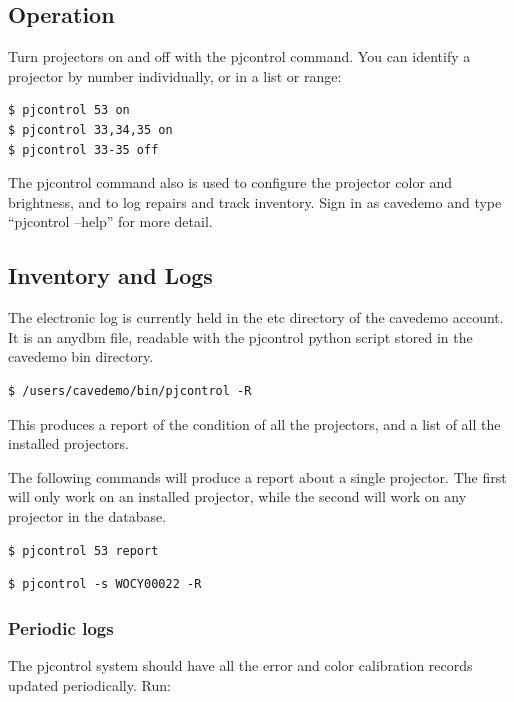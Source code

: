 \documentclass[11pt]{article}
\begin{document}
\subsection{Operation}
\label{projector-operation}

Turn projectors on and off with the pjcontrol command.  You can
identify a projector by number individually, or in a list or range: 

\begin{verbatim}
$ pjcontrol 53 on
$ pjcontrol 33,34,35 on
$ pjcontrol 33-35 off
\end{verbatim}

The pjcontrol command also is used to configure the projector color
and brightness, and to log repairs and track inventory.  Sign in as
cavedemo and type ``pjcontrol --help'' for more detail.


\subsection{Inventory and Logs}
\label{logging}

The electronic log is currently held in the etc directory of the
cavedemo account.  It is an anydbm file, readable with the pjcontrol
python script stored in the cavedemo bin directory.

\begin{verbatim}
$ /users/cavedemo/bin/pjcontrol -R
\end{verbatim}

This produces a report of the condition of all the projectors, and a
list of all the installed projectors.

The following commands will produce a report about a single
projector.  The first will only work on an installed projector, while
the second will work on any projector in the database.

\begin{verbatim}
$ pjcontrol 53 report
\end{verbatim}

\begin{verbatim}
$ pjcontrol -s WOCY00022 -R
\end{verbatim}

\subsubsection{Periodic logs}

The pjcontrol system should have all the error and color calibration
records updated periodically.  Run:
\end{document}
